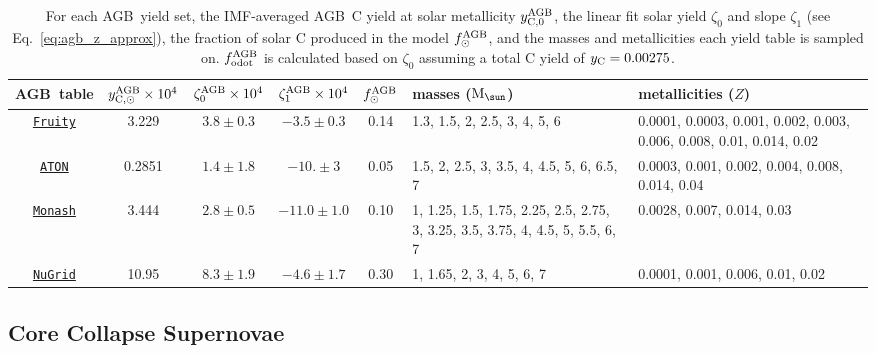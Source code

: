 \documentclass[fleqn,
usenatbib]{mnras}
\newcommand{\fruity}{\texttt{\hyperlink{fruity}{Fruity}}}
\newcommand{\nugrid}{\texttt{\hyperlink{nugrid}{NuGrid}}}
\newcommand{\monash}{\texttt{\hyperlink{monash}{Monash}}}
\newcommand{\aton}{\texttt{\hyperlink{aton}{ATON}}}
\newcommand{\agb}{AGB}
\newcommand{\Yct}{{y_{\rm C}}}
\newcommand{\zetao}{\zeta_0}
\newcommand{\zetai}{\zeta_{1}}
\newcommand{\Mo}{ {\rm M}_{\sun}}
\begin{document}
\begin{table}
	\centering
    \caption[]{For each \agb\ yield set, the IMF-averaged \agb\ C yield at solar metallicity $y_{\rm C, 0}^{\rm AGB}$, the linear fit solar yield $\zetao$ and slope $\zetai$ (see Eq.~\ref{eq:agb_z_approx}), the fraction of solar C produced in the model $f_\odot^{\rm AGB}$, and the masses and metallicities each yield table is sampled on.
    $f_{\rm odot}^{\rm AGB}$ is calculated based on $\zetao$ assuming a total C yield of $\Yct = 0.00275$.
    }

	\label{tab:agb}
    \begin{tabular}{c  ccc  c p{4cm} p{4cm}} %
		\hline 
        \agb\ table 
                & $y_{\rm C, \odot}^{\rm AGB}\times10^4$ %
                & $\zetao^{\rm AGB}\times 10^4$ %
                & $\zetai^{\rm AGB}\times 10^4$
                &  $f_\odot^{\rm AGB}$
                & masses ($\Mo$) & metallicities ($Z$)\\
        \hline
        \fruity 
                & 3.229
                &  $3.8\pm0.3$
                & $-3.5\pm0.3$
                & 0.14
                & 1.3, 1.5, 2, 2.5, 3, 4, 5, 6
                & 0.0001, 0.0003, 0.001, 0.002, 0.003, 0.006, 0.008, 0.01, 0.014, 0.02
                \\
        \aton 
                & 0.2851
                & $1.4\pm1.8$
                & $-10. \pm 3$
                & 0.05
                & 1.5, 2, 2.5, 3, 3.5, 4, 4.5, 5, 6, 6.5, 7
                & 0.0003, 0.001, 0.002, 0.004, 0.008, 0.014, 0.04
                \\
        \monash 
                &  3.444
                & $2.8 \pm 0.5$
                & $-11.0\pm 1.0$
                & 0.10
                & 1, 1.25, 1.5, 1.75, 2.25, 2.5, 2.75, 3, 3.25, 3.5, 3.75, 4, 4.5, 5, 5.5, 6, 7 
                & 0.0028, 0.007, 0.014, 0.03
                \\
        \nugrid 
                & 10.95
                & $8.3\pm 1.9$
                & $-4.6\pm1.7$
                & 0.30
                & 1, 1.65, 2, 3, 4, 5, 6, 7
                &  0.0001, 0.001, 0.006, 0.01, 0.02
                \\
		\hline
	\end{tabular}
\end{table}




\subsection{Core Collapse Supernovae}
\end{document}
